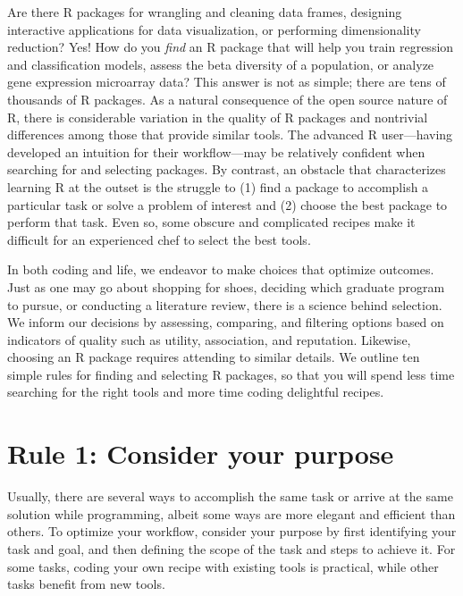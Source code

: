 \documentclass[10pt,letterpaper]{article}
\begin{document}
Are there R packages for wrangling and cleaning data frames, designing
interactive applications for data visualization, or performing
dimensionality reduction? Yes! How do you \emph{find} an R package that
will help you train regression and classification models, assess the
beta diversity of a population, or analyze gene expression microarray
data? This answer is not as simple; there are tens of thousands of R
packages. As a natural consequence of the open source nature of R, there
is considerable variation in the quality of R packages and nontrivial
differences among those that provide similar tools. The advanced R
user---having developed an intuition for their workflow---may be
relatively confident when searching for and selecting packages. By
contrast, an obstacle that characterizes learning R at the outset is the
struggle to (1) find a package to accomplish a particular task or solve
a problem of interest and (2) choose the best package to perform that
task. Even so, some obscure and complicated recipes make it difficult
for an experienced chef to select the best tools.

In both coding and life, we endeavor to make choices that optimize
outcomes. Just as one may go about shopping for shoes, deciding which
graduate program to pursue, or conducting a literature review, there is
a science behind selection. We inform our decisions by assessing,
comparing, and filtering options based on indicators of quality such as
utility, association, and reputation. Likewise, choosing an R package
requires attending to similar details. We outline ten simple rules for
finding and selecting R packages, so that you will spend less time
searching for the right tools and more time coding delightful recipes.

\hypertarget{rule-1-consider-your-purpose}{%
\section{Rule 1: Consider your
purpose}\label{rule-1-consider-your-purpose}}

Usually, there are several ways to accomplish the same task or arrive at
the same solution while programming, albeit some ways are more elegant
and efficient than others. To optimize your workflow, consider your
purpose by first identifying your task and goal, and then defining the
scope of the task and steps to achieve it. For some tasks, coding your
own recipe with existing tools is practical, while other tasks benefit
from new tools.
\end{document}
